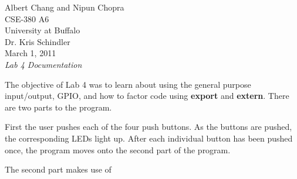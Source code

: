 \documentclass[letterpaper,10pt]{article}
\begin{document}
    Albert Chang and Nipun Chopra\\
    CSE-380 A6\\
    University at Buffalo\\
    Dr. Kris Schindler\\
    March 1, 2011\\
    \textit{Lab 4 Documentation}

    The objective of Lab 4 was to learn about using the general purpose
    input/output, GPIO, and how to factor code using \textbf{export} and
    \textbf{extern}. There are two parts to the program.

    First the user pushes each of the four push buttons. As the buttons are
    pushed, the corresponding LEDs light up. After each individual button has
    been pushed once, the program moves onto the second part of the program.

    The second part makes use of 
\end{document}
